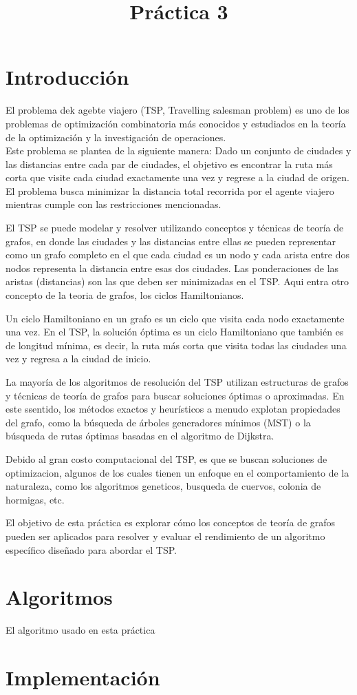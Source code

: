 \documentclass[]{report}
\title{Práctica 3}
\author{}
\begin{document}
\begin{abstract}
	
\end{abstract}
\section{Introducción}
	El problema dek agebte viajero (TSP, Travelling salesman problem) es uno de los problemas de optimización combinatoria más conocidos y estudiados en la teoría de la optimización y la investigación de operaciones.\\
	Este problema se plantea de la siguiente manera: Dado un conjunto de ciudades y las distancias entre cada par de ciudades, el objetivo es encontrar la ruta más corta que visite cada ciudad exactamente una vez y regrese a la ciudad de origen. El problema busca minimizar la distancia total recorrida por el agente viajero mientras cumple con las restricciones mencionadas.
	
	El TSP se puede modelar y resolver utilizando conceptos y técnicas de teoría de grafos, en donde las ciudades y las distancias entre ellas se pueden representar como un grafo completo en el que cada ciudad es un nodo y cada arista entre dos nodos representa la distancia entre esas dos ciudades. Las ponderaciones de las aristas (distancias) son las que deben ser minimizadas en el TSP. Aqui entra otro concepto de la teoria de grafos, los ciclos Hamiltonianos.
	
	Un ciclo Hamiltoniano en un grafo es un ciclo que visita cada nodo exactamente una vez. En el TSP, la solución óptima es un ciclo Hamiltoniano que también es de longitud mínima, es decir, la ruta más corta que visita todas las ciudades una vez y regresa a la ciudad de inicio.
	
	La mayoría de los algoritmos de resolución del TSP utilizan estructuras de grafos y técnicas de teoría de grafos para buscar soluciones óptimas o aproximadas. En este ssentido, los métodos exactos y heurísticos a menudo explotan propiedades del grafo, como la búsqueda de árboles generadores mínimos (MST) o la búsqueda de rutas óptimas basadas en el algoritmo de Dijkstra.
	
	Debido al gran costo computacional del TSP, es que se buscan soluciones de optimizacion, algunos de los cuales tienen un enfoque en el comportamiento de la naturaleza, como los algoritmos geneticos, busqueda de cuervos, colonia de hormigas, etc.
	
	El objetivo de esta práctica es explorar cómo los conceptos de teoría de grafos pueden ser aplicados para resolver y evaluar el rendimiento de un algoritmo específico diseñado para abordar el TSP.
\section{Algoritmos}
	El algoritmo usado en esta práctica
	
\section{Implementación}
\end{document}
